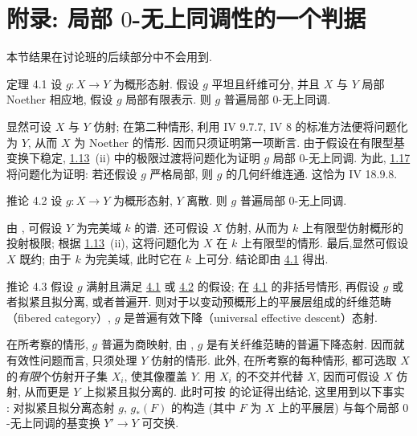 \section{附录: 局部 $0$-无上同调性的一个判据}\pageoriginale

本节结果在讨论班的后续部分中不会用到.

\begin{enonce*}{定理 4.1}
设 $g:X\rightarrow Y$ 为概形态射. 假设 $g$ 平坦且纤维可分, 并且 $X$ 与 $Y$ 局部 Noether \sisi{(}{}相应地, 假设 $g$ 局部有限表示\sisi{)}{}. 则 $g$ 普遍局部 $0$-无上同调.
\end{enonce*}

显然可设 $X$ 与 $Y$ 仿射; 在第二种情形, 利用 \EGA IV 9.7.7, \EGA IV 8 的标准方法便将问题化为 $Y$, 从而 $X$ 为 Noether 的情形. 因而只须证明第一项断言. 由于假设在有限型基变换下稳定, \hyperref[XV.prop1.13]{1.13}~(ii) 中的极限过渡将问题化为证明 $g$ 局部 $0$-无上同调. 为此, \hyperref[XV.cor1.17]{1.17} 将问题化为证明: 若还假设 $g$ 严格局部, 则 $g$ 的几何纤维连通. 这恰为 \EGA IV 18.9.8.

\begin{enonce*}{推论 4.2}
设 $g:X\rightarrow Y$ 为概形态射, $Y$ 离散. 则 $g$ 普遍局部 $0$-无上同调.
\end{enonce*}

由 , 可假设 $Y$ 为完美域 $k$ 的谱. 还可假设 $X$ 仿射, 从而为 $k$ 上有限型仿射概形的投射极限; 根据 \hyperref[XV.prop1.13]{1.13}~(ii), 这将问题化为 $X$ 在 $k$ 上有限型的情形. 最后,\pageoriginale 显然可假设 $X$ 既约; 由于 $k$ 为完美域, 此时它在 $k$ 上可分. 结论即由 \hyperref[XV.thm4.1]{4.1} 得出.

\begin{enonce*}{推论 4.3}
假设 $g$ 满射且满足 \hyperref[XV.thm4.1]{4.1} 或 \hyperref[XV.cor4.2]{4.2} 的假设; 在 \hyperref[XV.thm4.1]{4.1} 的非括号情形, 再假设 $g$ 或者拟紧且拟分离, 或者普遍开. 则对于以变动预概形上的平展层组成的纤维范畴（fibered category）, $g$ 是普遍有效下降（universal effective descent）态射.
\end{enonce*}

在所考察的情形, $g$ 普遍为商映射, 由 , $g$ 是有关纤维范畴的普遍下降态射. 因而就有效性问题而言, 只须处理 $Y$ 仿射的情形. 此外, 在所考察的每种情形, 都可选取 $X$ 的\emph{有限}个仿射开子集 $X_i$, 使其像覆盖 $Y$. 用 $X_i$ 的不交并代替 $X$, 因而可假设 $X$ 仿射, 从而更是 $Y$ 上拟紧且拟分离的. 此时可按  的论证得出结论, 这里用到以下事实 : 对拟紧且拟分离态射 $g$, $g_{\ast}(F)$ 的构造 (其中 $F$ 为 $X$ 上的平展层) 与每个局部 $0$-无上同调的基变换 $Y'\rightarrow Y$ 可交换.

